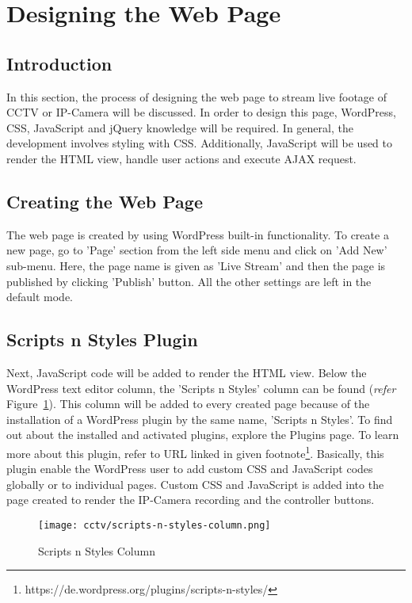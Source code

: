 \section{Designing the Web Page}\label{sec:cctv-designing-the-web-page}
\subsection{Introduction}
In this section, the process of designing the web page to stream live footage of CCTV or IP-Camera will be discussed. In order to design this page, WordPress, CSS, JavaScript and jQuery knowledge will be required. In general, the development involves styling with CSS. Additionally, JavaScript will be used to render the HTML view, handle user actions and execute AJAX request.

\subsection{Creating the Web Page}
The web page is created by using WordPress built-in functionality. To create a new page, go to 'Page' section from the left side menu and click on 'Add New' sub-menu. Here, the page name is given as 'Live Stream' and then the page is published by clicking 'Publish' button. All the other settings are left in the default mode.

\subsection{Scripts n Styles Plugin}
Next, JavaScript code will be added to render the HTML view. Below the WordPress text editor column, the 'Scripts n Styles' column can be found (\emph{refer} Figure~\ref{fig:scripts-n-styles-column}). This column will be added to every created page because of the installation of a WordPress plugin by the same name, 'Scripts n Styles'. To find out about the installed and activated plugins, explore the Plugins page. To learn more about this plugin, refer to URL linked in given footnote\footnote{https://de.wordpress.org/plugins/scripts-n-styles/}. Basically, this plugin enable the WordPress user to add custom CSS and JavaScript codes globally or to individual pages. Custom CSS and JavaScript is added into the page created to render the IP-Camera recording and the controller buttons.

\begin{figure}[ht]
\caption{Scripts n Styles Column}
\label{fig:scripts-n-styles-column}
\centering
\texttt{[image: cctv/scripts-n-styles-column.png]}
\end{figure}

